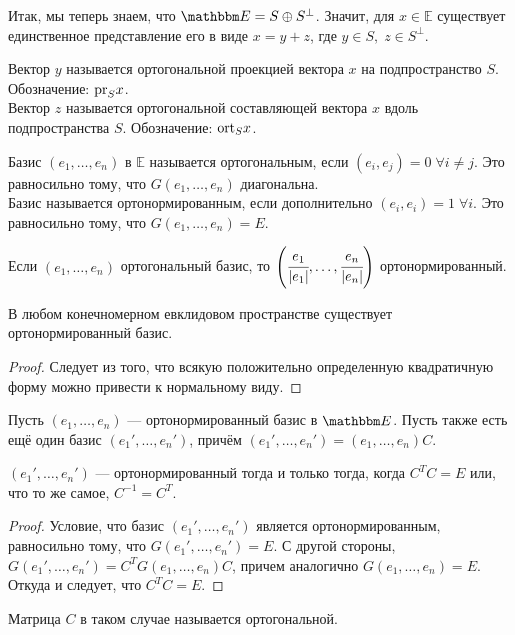 Итак, мы теперь знаем, что $\E = S \oplus S^\perp$. Значит, для $x \in \mathbb{E}$ существует единственное представление его в виде $x = y + z$, где $y \in S,\; z \in S^\perp$.
\begin{Def}
	Вектор $y$ называется ортогональной проекцией вектора $x$ на подпространство $S$. Обозначение: $\mathrm{pr}_S x$. \\ Вектор $z$ называется ортогональной составляющей вектора $x$ вдоль подпространства $S$. Обозначение: $\mathrm{ort}_S x$.
\end{Def}
\begin{Def}
	Базис $(e_1, \ldots, e_n)$ в $\mathbb{E}$ называется ортогональным, если $(e_i, e_j) = 0\; \forall i\neq j$. Это равносильно тому, что $G(e_1, \ldots, e_n)$ диагональна. \\Базис называется ортонормированным, если дополнительно $(e_i, e_i) = 1\; \forall i$. Это равносильно тому, что $G(e_1, \ldots, e_n) = E$.
\end{Def}
\begin{Comment}
	Если $(e_1,\ldots, e_n)$ ортогональный базис, то $\left(\cfrac{e_1}{|e_1|}, \ldots, \cfrac{e_n}{|e_n|}\right)$ ортонормированный.
\end{Comment}
\begin{Theorem}
	В любом конечномерном евклидовом пространстве существует ортонормированный базис.
\end{Theorem}
\begin{proof}
	Следует из того, что всякую положительно определенную квадратичную форму можно привести к нормальному виду. 
\end{proof}
Пусть $(e_1, \ldots, e_n)$ --- ортонормированный базис в $\E$. Пусть также есть ещё один базис $(e_1', \ldots, e_n')$, причём $(e_1', \ldots, e_n') = (e_1, \ldots, e_n)C$. 
\begin{Suggestion}
	$(e_1', \ldots, e_n')$ --- ортонормированный тогда и только тогда, когда $C^TC = E$ или, что то же самое, $C^{-1} = C^T$.
\end{Suggestion}
\begin{proof}
	Условие, что базис $(e_1', \ldots, e_n')$ является ортонормированным, равносильно тому, что $G(e_1', \ldots, e_n') = E$. С другой стороны, $G(e_1', \ldots, e_n') = C^TG(e_1, \ldots, e_n)C$, причем аналогично $G(e_1, \ldots, e_n) = E$. Откуда и следует, что $C^TC = E$.
\end{proof}
\begin{Def}
	Матрица $C$ в таком случае называется ортогональной.
\end{Def}

